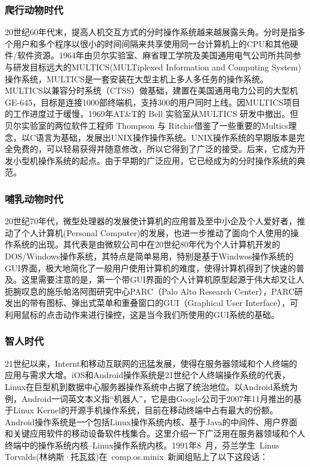 \subsubsection{爬行动物时代}

20世纪60年代末，提高人机交互方式的分时操作系统越来越展露头角。分时是指多个用户和多个程序以很小的时间间隔来共享使用同一台计算机上的CPU和其他硬件/软件资源。1964年由贝尔实验室、麻省理工学院及美国通用电气公司所共同参与研发目标远大的MULTICS(MULTiplexed Information and Computing System)操作系统，MULTICS是一套安装在大型主机上多人多任务的操作系统。 MULTICS以兼容分时系统（CTSS）做基础，建置在美国通用电力公司的大型机GE-645，目标是连接1000部终端机，支持300的用户同时上线。因MULTICS项目的工作进度过于缓慢，1969年AT\&T的 Bell 实验室从MULTICS 研发中撤出。但贝尔实验室的两位软件工程师 Thompson 与 Ritchie借鉴了一些重要的Multics理念，以C语言为基础，发展出UNIX操作操作系统。UNIX操作系统的早期版本是完全免费的，可以轻易获得并随意修改，所以它得到了广泛的接受。后来，它成为开发小型机操作系统的起点。由于早期的广泛应用，它已经成为的分时操作系统的典范。

\subsubsection{哺乳动物时代}

20世纪70年代，微型处理器的发展使计算机的应用普及至中小企及个人爱好者，推动了个人计算机(Personal Computer)的发展，也进一步推动了面向个人使用的操作系统的出现。其代表是由微软公司中在20世纪80年代为个人计算机开发的DOS/Windows操作系统，其特点是简单易用，特别是基于Windwos操作系统的GUI界面，极大地简化了一般用户使用计算机的难度，使得计算机得到了快速的普及。这里需要注意的是，第一个带GUI界面的个人计算机原型起源于伟大却又让人扼腕叹息的施乐帕洛阿图研究中心PARC（Palo Alto Research Center），PARC研发出的带有图标、弹出式菜单和重叠窗口的GUI（Graphical User Interface），可利用鼠标的点击动作来进行操控，这是当今我们所使用的GUI系统的基础。

\subsubsection{智人时代}

21世纪以来，Internt和移动互联网的迅猛发展，使得在服务器领域和个人终端的应用与需求大增。iOS和Android操作系统是21世纪个人终端操作系统的代表，Linux在巨型机到数据中心服务器操作系统中占据了统治地位。以Android系统为例，Android一词英文本义指“机器人”，它是由Google公司于2007年11月推出的基于Linux Kernel的开源手机操作系统，目前在移动终端中占有最大的份额。Android操作系统是一个包括Linux操作系统内核、基于Java的中间件、用户界面和关键应用软件的移动设备软件栈集合。这里介绍一下广泛用在服务器领域和个人终端中的操作系统内核--Linux操作系统内核。1991年8 月，芬兰学生 Linus Torvalds(林纳斯·托瓦兹)在 comp.os.minix 新闻组贴上了以下这段话： 

